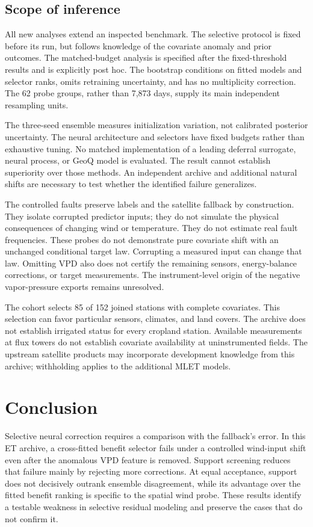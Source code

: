 \documentclass[10pt,letterpaper]{article}
\begin{document}
\subsection{Scope of inference}
All new analyses extend an inspected benchmark.
The selective protocol is fixed before its run, but follows knowledge of the covariate anomaly and prior outcomes.
The matched-budget analysis is specified after the fixed-threshold results and is explicitly post hoc.
The bootstrap conditions on fitted models and selector ranks, omits retraining uncertainty, and has no multiplicity correction.
The 62 probe groups, rather than 7,873 days, supply its main independent resampling units.

The three-seed ensemble measures initialization variation, not calibrated posterior uncertainty.
The neural architecture and selectors have fixed budgets rather than exhaustive tuning.
No matched implementation of a leading deferral surrogate, neural process, or GeoQ model is evaluated.
The result cannot establish superiority over those methods.
An independent archive and additional natural shifts are necessary to test whether the identified failure generalizes.

The controlled faults preserve labels and the satellite fallback by construction.
They isolate corrupted predictor inputs; they do not simulate the physical consequences of changing wind or temperature.
They do not estimate real fault frequencies.
These probes do not demonstrate pure covariate shift with an unchanged conditional target law.
Corrupting a measured input can change that law.
Omitting VPD also does not certify the remaining sensors, energy-balance corrections, or target measurements.
The instrument-level origin of the negative vapor-pressure exports remains unresolved.

The cohort selects 85 of 152 joined stations with complete covariates.
This selection can favor particular sensors, climates, and land covers.
The archive does not establish irrigated status for every cropland station.
Available measurements at flux towers do not establish covariate availability at uninstrumented fields.
The upstream satellite products may incorporate development knowledge from this archive; withholding applies to the additional MLET models.

\section{Conclusion}
Selective neural correction requires a comparison with the fallback's error.
In this ET archive, a cross-fitted benefit selector fails under a controlled wind-input shift even after the anomalous VPD feature is removed.
Support screening reduces that failure mainly by rejecting more corrections.
At equal acceptance, support does not decisively outrank ensemble disagreement, while its advantage over the fitted benefit ranking is specific to the spatial wind probe.
These results identify a testable weakness in selective residual modeling and preserve the cases that do not confirm it.
\end{document}
